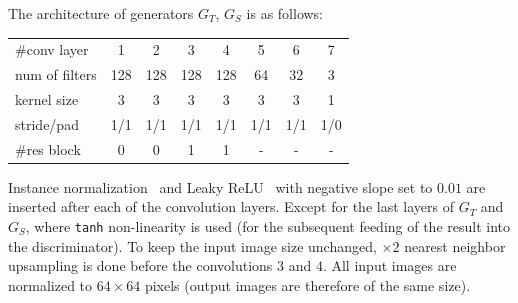 The architecture of generators $G_T$, $G_S$ is as follows:
\begin{center}
\begin{scriptsize}
\begin{tabular}{l | c c c c c c c}
\hline
  \#conv layer      &1      &2    &3     &4    &5    &6    & 7 \\
  num of filters    &128    &128  &128   &128  &64   &32   & 3 \\
  kernel size       &3      &3    &3     & 3   &3    &3    & 1 \\
  stride/pad        &1/1    &1/1  &1/1   &1/1  &1/1  &1/1  & 1/0  \\
  \#res block       &0      &0    &1     &1    &-    &-    & -  \\
\hline
\end{tabular}
\end{scriptsize}
\end{center}
\vspace{0.5em}

Instance normalization~\cite{UlyanovVL17} and Leaky ReLU~\cite{HeZRS15} with negative slope set to $0.01$ are inserted after each of the convolution layers. Except for the last layers of $G_T$ and $G_S$, where \texttt{tanh} non-linearity is used (for the subsequent feeding of the result into the discriminator). To keep the input image size unchanged,  $\times 2$ nearest neighbor upsampling is done before the convolutions $3$ and $4$.
All input images are normalized to $64\times64$ pixels (output images are therefore of the same size). 




